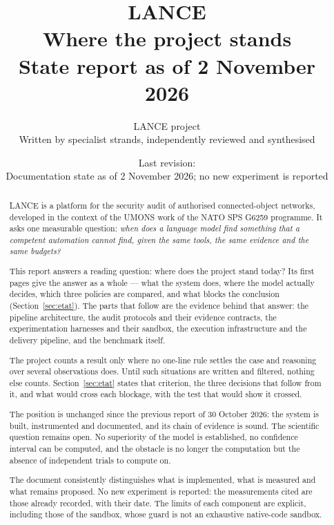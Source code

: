 \documentclass[11pt,a4paper]{article}
\title{LANCE\\[4pt]
\large Where the project stands\\[2pt]
\normalsize State report as of 2 November 2026}
\author{LANCE project\\\small Written by specialist strands, independently reviewed and synthesised}
\date{Last revision: \revision\\[3pt]
\small Documentation state as of 2 November 2026; no new experiment is reported}
\begin{document}
\maketitle

\begin{abstract}
LANCE is a platform for the security audit of authorised connected-object
networks, developed in the context of the UMONS work of the NATO SPS G6259
programme. It asks one measurable question: \emph{when does a language model find
something that a competent automation cannot find, given the same tools, the same
evidence and the same budgets?}

This report answers a reading question: where does the project stand today? Its
first pages give the answer as a whole --- what the system does, where the model
actually decides, which three policies are compared, and what blocks the
conclusion (Section~\ref{sec:etat}). The parts that follow are the evidence behind
that answer: the pipeline architecture, the audit protocols and their evidence
contracts, the experimentation harnesses and their sandbox, the execution
infrastructure and the delivery pipeline, and the benchmark itself.

The project counts a result only where no one-line rule settles the case and
reasoning over several observations does. Until such situations are written and
filtered, nothing else counts. Section~\ref{sec:etat} states that criterion, the
three decisions that follow from it, and what would cross each blockage, with the
test that would show it crossed.

The position is unchanged since the previous report of 30 October 2026: the system
is built, instrumented and documented, and its chain of evidence is sound. The
scientific question remains open. No superiority of the model is established, no
confidence interval can be computed, and the obstacle is no longer the
computation but the absence of independent trials to compute on.

The document consistently distinguishes what is implemented, what is measured and
what remains proposed. No new experiment is reported: the measurements cited are
those already recorded, with their date. The limits of each component are
explicit, including those of the sandbox, whose guard is not an exhaustive
native-code sandbox.
\end{abstract}

\tableofcontents


\end{document}
